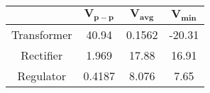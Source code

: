 \small
\begin{tabular}{|c|c|c|c|}
	\hline
	\tbf{Output} &
		$\mathbf{V_{p-p}}$ \tbf{(\si{\volt})}&
			$\mathbf{V_{avg}}$ \tbf{(\si{\volt})}&
				$\mathbf{V_{min}}$ \tbf{(\si{\volt})} \\ \hline
	Transformer & 40.94 & 0.1562 & -20.31\\ \hline
	Rectifier   & 1.969 & 17.88 & 16.91 \\ \hline
	Regulator   & 0.4187 & 8.076 & 7.65 \\ \hline
\end{tabular}
